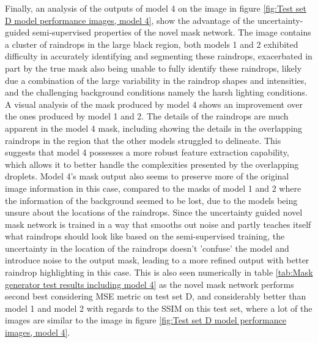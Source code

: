 \documentclass[11pt]{ociamthesis}  %
\begin{document}
Finally, an analysis of the outputs of model 4 on the image in figure \ref{fig:Test set D model performance images, model 4}, show the advantage of the uncertainty-guided semi-supervised properties of the novel mask network. The image contains a cluster of raindrops in the large black region, both models 1 and 2 exhibited difficulty in accurately identifying and segmenting these raindrops, exacerbated in part by the true mask also being unable to fully identify these raindrops, likely due a combination of the large variability in the raindrop shapes and intensities, and the challenging background conditions namely the harsh lighting conditions. A visual analysis of the mask produced by model 4 shows an improvement over the ones produced by model 1 and 2. The details of the raindrops are much apparent in the model 4 mask, including showing the details in the overlapping raindrops in the region that the other models struggled to delineate. This suggests that model 4 possesses a more robust feature extraction capability, which allows it to better handle the complexities presented by the overlapping droplets. Model 4's mask output also seems to preserve more of the original image information in this case, compared to the masks of model 1 and 2 where the information of the background seemed to be lost, due to the models being unsure about the locations of the raindrops. Since the uncertainty guided novel mask network is trained in a way that smooths out noise and partly teaches itself what raindrops should look like based on the semi-supervised training, the uncertainty in the location of the raindrops doesn't 'confuse' the model and introduce noise to the output mask, leading to a more refined output with better raindrop highlighting in this case. This is also seen numerically in table \ref{tab:Mask generator test results including model 4} as the novel mask network performs second best considering MSE metric on test set D, and considerably better than model 1 and model 2 with regards to the SSIM on this test set, where a lot of the images are similar to the image in figure \ref{fig:Test set D model performance images, model 4}.
\end{document}
